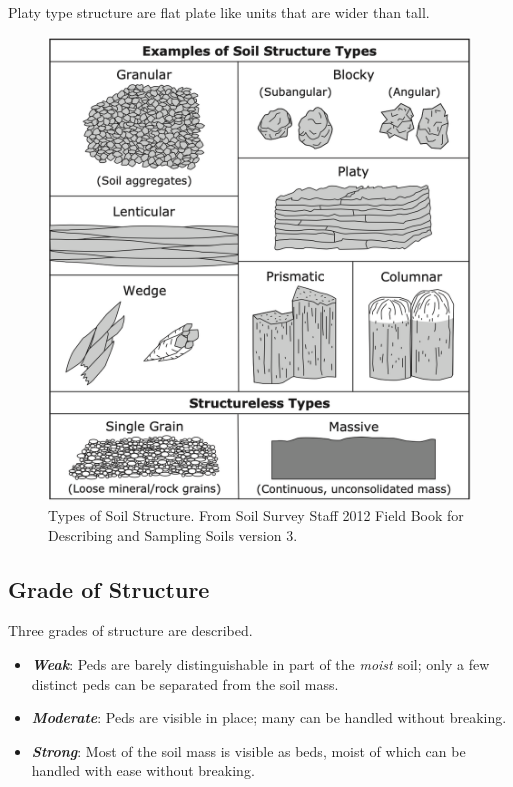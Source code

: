 \documentclass[letterpaper, 12pt]{article}
\begin{document}
Platy type structure are flat plate like units that are wider than tall.

\begin{figure}
    \centering
    \includegraphics[width=0.8\columnwidth]{images/FieldBookVer3_ExamplesSoilStructureTypes1045x1145.png}
    \caption{Types of Soil Structure. From Soil Survey Staff 2012 Field Book for Describing and Sampling Soils version 3.}
    \label{fig:SoilStructureTypes}
\end{figure}

\subsection{Grade of Structure}
    
Three grades of structure are described.

\begin{itemize}
    \item \textbf{\textit{Weak}}: Peds are barely distinguishable in part of the \textit{moist} soil; only a few distinct peds can be separated from the soil mass.
    \item \textbf{\textit{Moderate}}: Peds are visible in place; many can be handled without breaking.
    \item \textbf{\textit{Strong}}: Most of the soil mass is visible as beds, moist of which can be handled with ease without breaking.
\end{itemize}
\end{document}
